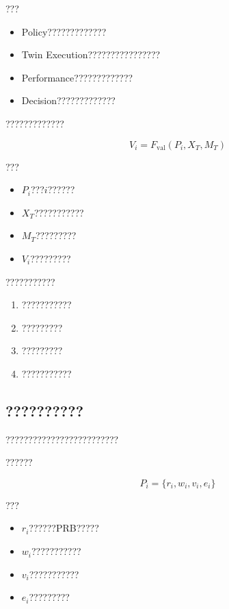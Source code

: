 ???

\begin{itemize}
    \item Policy?????????????
    \item Twin Execution????????????????
    \item Performance?????????????
    \item Decision?????????????
\end{itemize}

?????????????

\begin{equation}
V_i
=
F_{\mathrm{val}}
(
P_i,
X_T,
M_T
)
\end{equation}

???

\begin{itemize}
    \item $P_i$???$i$??????
    \item $X_T$???????????
    \item $M_T$?????????
    \item $V_i$?????????
\end{itemize}


???????????

\begin{enumerate}
    \item ???????????
    \item ?????????
    \item ?????????
    \item ???????????
\end{enumerate}



\subsection*{??????????}

?????????????????????????

??????

\begin{equation}
P_i
=
\{
r_i,w_i,v_i,e_i
\}
\end{equation}

???

\begin{itemize}
    \item $r_i$??????PRB?????
    \item $w_i$???????????
    \item $v_i$???????????
    \item $e_i$?????????
\end{itemize}


